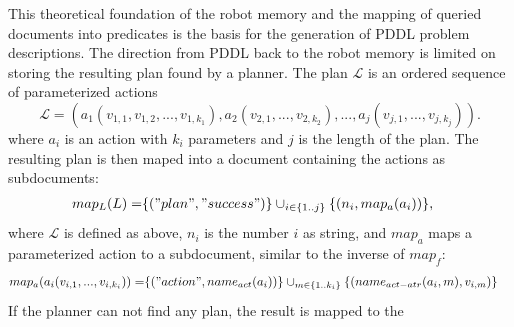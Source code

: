 This theoretical foundation of the robot memory and the mapping of
queried documents into predicates is the basis for the generation of
PDDL problem descriptions. The direction from PDDL back to the robot
memory is limited on storing the resulting plan found by a
planner. The plan $\mathcal{L}$ is an ordered sequence of
parameterized actions
$$\mathcal{L}=(a_1(v_{1,1},v_{1,2},...,v_{1,k_1}),a_2(v_{2,1},...,v_{2,k_2}),...,a_j(v_{j,1},...,v_{j,k_j})) \text{.}$$
where $a_i$ is an action with $k_i$ parameters and $j$ is the length
of the plan. The resulting plan is then maped into a document
containing the actions as subdocuments:
\begin{align*}
  map_L(L)=&\{("plan", "success")\} \cup_{i \in \{1..j\}}\{(n_i, map_a(a_i))\} \text{,}
\end{align*}
where $\mathcal{L}$ is defined as above, $n_i$ is the number $i$ as
string, and $map_a$ maps a parameterized action to a subdocument,
similar to the inverse of $map_f$:
\begin{align*}
  map_a(a_i(v_{i,1},...,v_{i,k_i}))= &\{("action", name_{act}(a_i))\} 
\cup_{m \in \{1..k_i\}}\{(name_{act-atr}(a_i,m), v_{i,m})\}
\end{align*}
If the planner can not find any plan, the result is mapped to the
